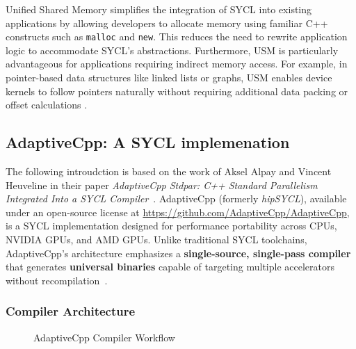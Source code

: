 Unified Shared Memory simplifies the integration of SYCL into existing applications by allowing developers to allocate memory using
familiar C++ constructs such as \texttt{malloc} and \texttt{new}. This reduces the need to rewrite application logic to accommodate
SYCL’s abstractions. Furthermore, USM is particularly advantageous for applications requiring indirect memory access. For example, in
pointer-based data structures like linked lists or graphs, USM enables device kernels to follow pointers naturally without requiring
additional data packing or offset calculations \cite{reinders2020data, SYCL2020}.



\subsection{AdaptiveCpp: A SYCL implemenation}
\label{sec:adaptivecpp}
%


The following introudction is based on the work of Aksel Alpay and Vincent Heuveline in their paper
\textit{AdaptiveCpp Stdpar: C++ Standard Parallelism Integrated Into a SYCL Compiler}~\cite{alpay2021}.
AdaptiveCpp (formerly \textit{hipSYCL}), available under an open-source license at 
\url{https://github.com/AdaptiveCpp/AdaptiveCpp}, is a SYCL implementation designed for performance portability
across CPUs, NVIDIA GPUs, and AMD GPUs. Unlike traditional SYCL toolchains, AdaptiveCpp’s architecture emphasizes
a \textbf{single-source, single-pass compiler} that generates \textbf{universal binaries} capable of targeting
multiple accelerators without recompilation~\cite{alpay2021}.

\subsubsection*{Compiler Architecture}

\begin{figure}[h]
    \centering
    
    \caption{AdaptiveCpp Compiler Workflow}
    \label{fig:acpp_compiler_workflow}
\end{figure}

